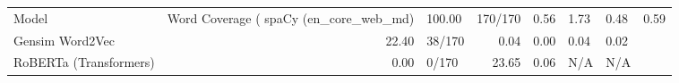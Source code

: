 \begin{tabular}{lrlrrll}
\toprule
Model & Word Coverage (%
\midrule
spaCy (en_core_web_md) & 100.00 & 170/170 & 0.56 & 1.73 & 0.48 & 0.59 \\
Gensim Word2Vec & 22.40 & 38/170 & 0.04 & 0.00 & 0.04 & 0.02 \\
RoBERTa (Transformers) & 0.00 & 0/170 & 23.65 & 0.06 & N/A & N/A \\
\bottomrule
\end{tabular}
